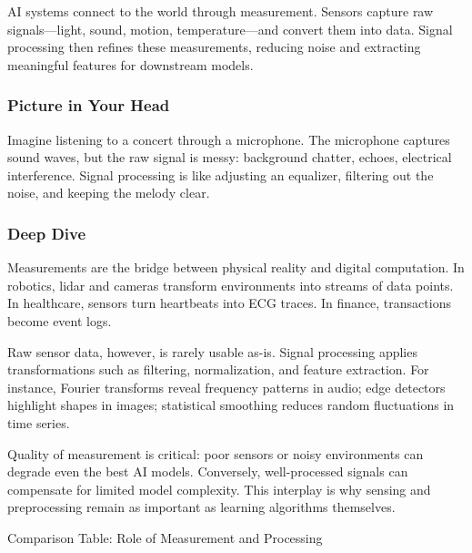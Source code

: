 \documentclass[
  letterpaper,
  DIV=11,
  numbers=noendperiod]{scrreprt}
\begin{document}
AI systems connect to the world through measurement. Sensors capture raw
signals---light, sound, motion, temperature---and convert them into
data. Signal processing then refines these measurements, reducing noise
and extracting meaningful features for downstream models.

\subsubsection{Picture in Your Head}\label{picture-in-your-head-72}

Imagine listening to a concert through a microphone. The microphone
captures sound waves, but the raw signal is messy: background chatter,
echoes, electrical interference. Signal processing is like adjusting an
equalizer, filtering out the noise, and keeping the melody clear.

\subsubsection{Deep Dive}\label{deep-dive-72}

Measurements are the bridge between physical reality and digital
computation. In robotics, lidar and cameras transform environments into
streams of data points. In healthcare, sensors turn heartbeats into ECG
traces. In finance, transactions become event logs.

Raw sensor data, however, is rarely usable as-is. Signal processing
applies transformations such as filtering, normalization, and feature
extraction. For instance, Fourier transforms reveal frequency patterns
in audio; edge detectors highlight shapes in images; statistical
smoothing reduces random fluctuations in time series.

Quality of measurement is critical: poor sensors or noisy environments
can degrade even the best AI models. Conversely, well-processed signals
can compensate for limited model complexity. This interplay is why
sensing and preprocessing remain as important as learning algorithms
themselves.

Comparison Table: Role of Measurement and Processing
\end{document}
